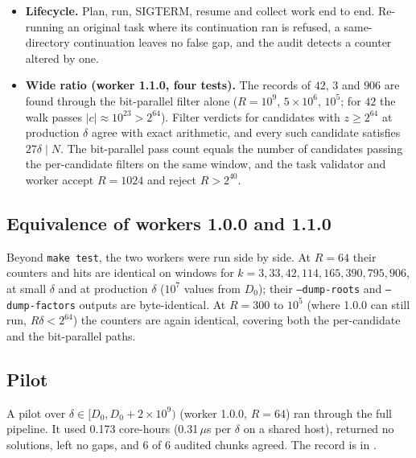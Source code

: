 \documentclass[11pt,a4paper]{article}
\theoremstyle{remark}
\newcommand{\code}[1]{\path{#1}}
\begin{document}
\begin{itemize}[leftmargin=*]
\begin{itemize}
    \item Raw worker output and duplicated hits are handled; a repeated component gives two
    points.
  \end{itemize}
\item \textbf{Lifecycle.} Plan, run, SIGTERM, resume and collect work end to end. Re-running
an original task where its continuation ran is refused, a same-directory continuation leaves
no false gap, and the audit detects a counter altered by one.
\item \textbf{Wide ratio (worker 1.1.0, four tests).} The records of $42$, $3$ and $906$ are found
through the bit-parallel filter alone ($R=10^9$, $5\times10^6$, $10^5$; for $42$ the walk passes
$|c|\approx10^{23}>2^{64}$). Filter verdicts for candidates with $z\ge2^{64}$ at production
$\delta$ agree with exact arithmetic, and every such candidate satisfies $27\delta\mid N$. The
bit-parallel pass count equals the number of candidates passing the per-candidate filters on
the same window, and the task validator and worker accept $R=1024$ and reject $R>2^{40}$.
\end{itemize}

\subsection{Equivalence of workers 1.0.0 and 1.1.0}
Beyond \texttt{make test}, the two workers were run side by side. At $R=64$ their counters and
hits are identical on windows for $k=3,33,42,114,165,390,795,906$, at small $\delta$ and at
production $\delta$ ($10^7$ values from $D_0$); their \texttt{--dump-roots} and
\texttt{--dump-factors} outputs are byte-identical. At $R=300$ to $10^5$ (where 1.0.0 can still
run, $R\delta<2^{64}$) the counters are again identical, covering both the per-candidate and the
bit-parallel paths.

\subsection{Pilot}
A pilot over $\delta\in[D_0,D_0+2\times10^9)$ (worker 1.0.0, $R=64$) ran through the full pipeline. It used
0.173 core-hours (0.31\,$\mu$s per $\delta$ on a shared host), returned no solutions, left
no gaps, and 6 of 6 audited chunks agreed. The record is in \code{gap-search/validation/pilot/}.
\end{document}
